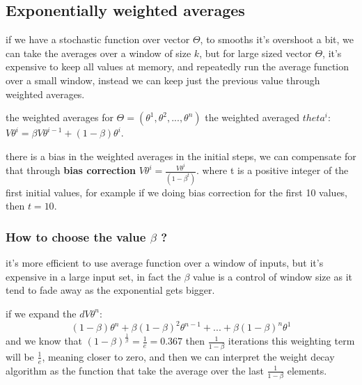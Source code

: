 \documentclass[4apaper,12pt]{book}
\begin{document}
\begin{appendices}
  \chapter {Exponentially weighted averages}
  \begin{description}
  \item if we have a stochastic function over vector $\Theta$, to smooths it's overshoot a bit, we can take the averages over a window of size $k$, but for large sized vector $\Theta$, it's expensive to keep all values at memory, and repeatedly run the average function over a small window, instead we can keep just the previous value through weighted averages.
  \item the weighted averages for $\Theta=(\theta^1,\theta^2,...,\theta^n)$ the weighted averaged $theta^i$: $V\theta^i=\beta V \theta^{i-1} + (1-\beta) \theta^i$.
  \item there is a bias in the weighted averages in the initial steps, we can compensate for that through \textbf{bias correction} $V\theta^i=\frac{V\theta^i}{(1-\beta^t)}$. where t is a positive integer of the first initial values, for example if we doing bias correction for the first 10 values, then $t=10$.
    \subsection {How to choose the value $\beta$ ?}
    \begin{description}
    \item it's more efficient to use average function over a window of inputs, but it's expensive in a large input set, in fact the $\beta$ value is a control of window size as it tend to fade away as the exponential gets bigger.
    \item if we expand the $dV\theta^n$: $$
      (1-\beta)\theta^{n} + \beta(1-\beta)^2\theta^{n-1} + ... + \beta(1-\beta)^{n}\theta^1
      $$ and we know that $(1-\beta)^{\frac{1}{\beta}} = \frac{1}{e} = 0.367$ then $\frac{1}{1-\beta}$ iterations this weighting term will be $\frac{1}{e}$, meaning closer to zero, and then we can interpret the weight decay algorithm as the function that take the average over the last $\frac{1}{1-\beta}$ elements.

    \end{description}
  \end{description}

\end{appendices}
\end{document}
